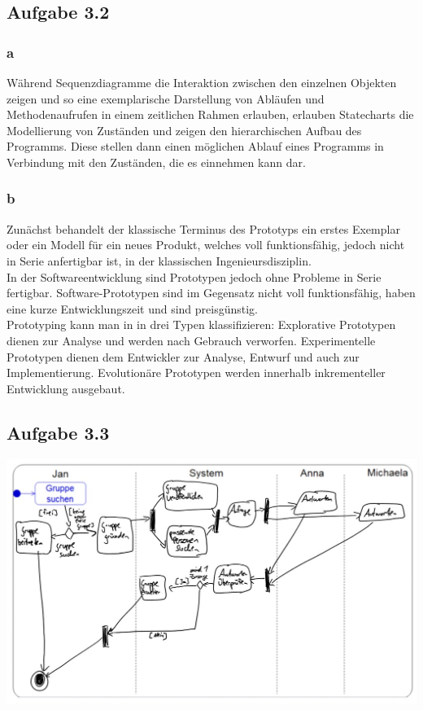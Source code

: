 \documentclass[a4paper,graphics,11pt]{article}
\newcommand\aufgabe[1]{\subsection*{Aufgabe #1}}
\newcommand\aufgabenteil[1]{\subsubsection*{#1}}
\begin{document}
\aufgabe{3.2}
\aufgabenteil{a}
W{\"a}hrend Sequenzdiagramme die Interaktion zwischen den einzelnen Objekten zeigen und so eine exemplarische Darstellung von Abl{\"a}ufen und Methodenaufrufen in einem zeitlichen Rahmen erlauben, erlauben Statecharts die Modellierung von Zust{\"a}nden und zeigen den hierarchischen Aufbau des Programms. Diese stellen dann einen m{\"o}glichen Ablauf eines Programms in Verbindung mit den Zust{\"a}nden, die es einnehmen kann dar.
\aufgabenteil{b}
Zun{\"a}chst behandelt der klassische Terminus des Prototyps ein erstes Exemplar oder ein Modell f{\"u}r ein neues Produkt, welches voll funktionsf{\"a}hig, jedoch nicht in Serie anfertigbar ist, in der klassischen Ingenieursdisziplin.\\
In der Softwareentwicklung sind Prototypen jedoch ohne Probleme in Serie fertigbar. Software-Prototypen sind im Gegensatz nicht voll funktionsf{\"a}hig, haben eine kurze Entwicklungszeit und sind preisg{\"u}nstig.\\
Prototyping kann man in in drei Typen klassifizieren: Explorative Prototypen dienen zur Analyse und werden nach Gebrauch verworfen. Experimentelle Prototypen dienen dem Entwickler zur Analyse, Entwurf und auch zur Implementierung. Evolution{\"a}re Prototypen werden innerhalb inkrementeller Entwicklung ausgebaut.
\aufgabe{3.3}
\begin{center}
\includegraphics[scale=0.35]{33}
\end{center}
\end{document}
